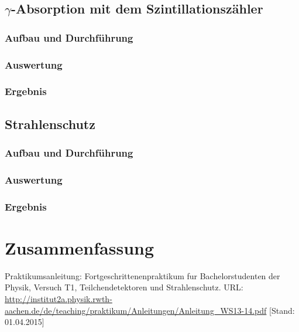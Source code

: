 \documentclass{../Misc/MontavonLaTeX/Montavon}
\begin{document}
\subsection{$\gamma$-Absorption mit dem Szintillationszähler}
\subsubsection{Aufbau und Durchführung}
\subsubsection{Auswertung}
\subsubsection{Ergebnis}

\subsection{Strahlenschutz}
\subsubsection{Aufbau und Durchführung}
\subsubsection{Auswertung}
\subsubsection{Ergebnis}

\section{Zusammenfassung}

\newpage
\begin{thebibliography}{xxxx}
 Praktikumsanleitung: Fortgeschrittenenpraktikum fur Bachelorstudenten der Physik, Versuch T1, Teilchendetektoren und Strahlenschutz. URL: \url{http://institut2a.physik.rwth-aachen.de/de/teaching/praktikum/Anleitungen/Anleitung_WS13-14.pdf} [Stand: 01.04.2015]
\end{thebibliography}
\end{document}
